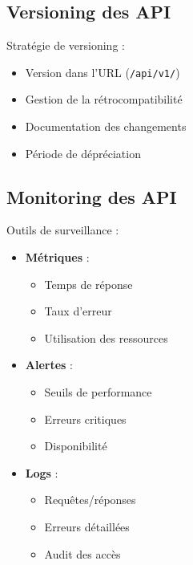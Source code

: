 \subsection{Versioning des API}
Stratégie de versioning :

\begin{itemize}
    \item Version dans l'URL (\texttt{/api/v1/})
    \item Gestion de la rétrocompatibilité
    \item Documentation des changements
    \item Période de dépréciation
\end{itemize}

\subsection{Monitoring des API}
Outils de surveillance :

\begin{itemize}
    \item \textbf{Métriques} :
    \begin{itemize}
        \item Temps de réponse
        \item Taux d'erreur
        \item Utilisation des ressources
    \end{itemize}
    
    \item \textbf{Alertes} :
    \begin{itemize}
        \item Seuils de performance
        \item Erreurs critiques
        \item Disponibilité
    \end{itemize}
    
    \item \textbf{Logs} :
    \begin{itemize}
        \item Requêtes/réponses
        \item Erreurs détaillées
        \item Audit des accès
    \end{itemize}
\end{itemize}

